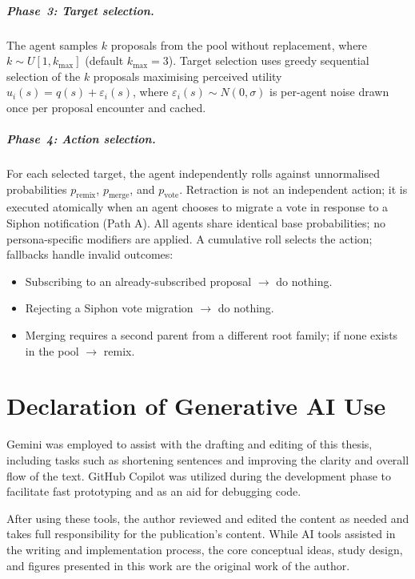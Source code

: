\documentclass[a4paper, 12pt, twoside]{iviathesis}
\begin{document}
\paragraph{Phase~3: Target selection.}
The agent samples $k$ proposals from the pool without replacement, where $k \sim U[1, k_{\max}]$ (default $k_{\max} = 3$). Target selection uses greedy sequential selection of the $k$ proposals maximising perceived utility $u_i(s) = q(s) + \varepsilon_i(s)$, where $\varepsilon_i(s) \sim N(0, \sigma)$ is per-agent noise drawn once per proposal encounter and cached.

\paragraph{Phase~4: Action selection.}
For each selected target, the agent independently rolls against unnormalised probabilities $p_{\text{remix}}$, $p_{\text{merge}}$, and $p_{\text{vote}}$. Retraction is not an independent action; it is executed atomically when an agent chooses to migrate a vote in response to a Siphon notification (Path A). All agents share identical base probabilities; no persona-specific modifiers are applied. A cumulative roll selects the action; fallbacks handle invalid outcomes:
\begin{itemize}
    \item Subscribing to an already-subscribed proposal $\to$ do nothing.
    \item Rejecting a Siphon vote migration $\to$ do nothing.
    \item Merging requires a second parent from a different root family; if none exists in the pool $\to$ remix.
\end{itemize}


\backmatter

\chapter*{Declaration of Generative AI Use}

Gemini was employed to assist with the drafting and editing of this thesis, including tasks such as shortening sentences and improving the clarity and overall flow of the text. GitHub Copilot was utilized during the development phase to facilitate fast prototyping and as an aid for debugging code.

After using these tools, the author reviewed and edited the content as needed and takes full responsibility for the publication's content. While AI tools assisted in the writing and implementation process, the core conceptual ideas, study design, and figures presented in this work are the original work of the author.

 

\end{document}
